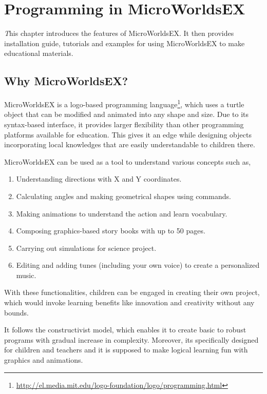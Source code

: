 \chapter{Programming in {MicroWorldsEX}}

\epigraph{\emph This chapter introduces the features of MicroWorldsEX. It then provides installation guide, tutorials and examples for using MicroWorldsEX to make educational materials.}{}

\newpage

\section{Why MicroWorldsEX?}

MicroWorldsEX is a logo-based programming language\footnote{\url{http://el.media.mit.edu/logo-foundation/logo/programming.html}}, which uses a turtle object that can be modified and animated into any shape and size. Due to its syntax-based interface, it provides larger flexibility than other programming platforms available for education. This gives it an edge while designing objects incorporating local knowledges that are easily understandable to children there. 

MicroWorldsEX can be used as a tool to understand various concepts such as,

\begin{enumerate}
 

\item Understanding directions with X and Y coordinates.
\item Calculating angles and making geometrical shapes using commands.
\item Making animations to understand the action and learn vocabulary.
\item Composing graphics-based story books with up to 50 pages.
\item Carrying out simulations for science project.
\item Editing and adding tunes (including your own voice) to create a personalized music.
\end{enumerate}
With these functionalities, children can be engaged in creating their own project, which would invoke learning benefits like innovation and creativity without any bounds.

It follows the constructivist model, which enables it to create basic to robust programs with gradual increase in complexity. Moreover, its specifically designed for children and teachers and it is supposed to make logical learning fun with graphics and animations.


